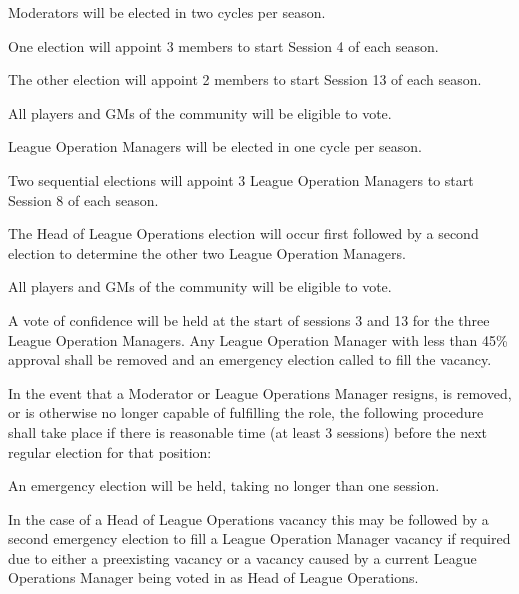 \begin{deepEnumerate}
\begin{deepEnumerate}
	\end{deepEnumerate}
	\item Moderators will be elected in two cycles per season.
	\begin{deepEnumerate}
		\item One election will appoint 3 members to start Session 4 of each season.
		\item The other election will appoint 2 members to start Session 13 of each season.
		\item All players and GMs of the community will be eligible to vote.
	\end{deepEnumerate}
	\item League Operation Managers will be elected in one cycle per season.
	\begin{deepEnumerate}
		\item Two sequential elections will appoint 3 League Operation Managers to start Session 8 of each season.
		\begin{deepEnumerate}
			\item The Head of League Operations election will occur first followed by a second election to determine the other two League Operation Managers.
		\end{deepEnumerate}
		\item All players and GMs of the community will be eligible to vote.
		\item A vote of confidence will be held at the start of sessions 3 and 13 for the three League Operation Managers. Any League Operation Manager with less than
		 45\% approval shall be removed and an emergency election called to fill the vacancy.
	\end{deepEnumerate}
	\item In the event that a Moderator or League Operations Manager resigns, is removed, or is otherwise no longer capable of fulfilling the role, the following
	procedure shall take place if there is reasonable time (at least 3 sessions) before the next regular election for that position:
	\begin{deepEnumerate}
		\item An emergency election will be held, taking no longer than one session.
		\begin{deepEnumerate}
			\item In the case of a Head of League Operations vacancy this may be followed by a second emergency election to fill a League Operation Manager vacancy
			if required due to either a preexisting vacancy or a vacancy caused by a current League Operations Manager being voted in as Head of League Operations.

\end{deepEnumerate}
\end{deepEnumerate}
\end{deepEnumerate}
